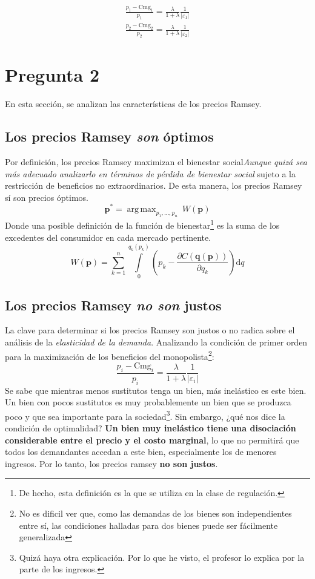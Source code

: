 \documentclass{article}
\DeclareMathOperator*{\argmax}{arg\,max}
\begin{document}
\begin{align}
    \frac{p_1 - \text{Cmg}_1}{p_1} = \frac{\lambda}{1+\lambda}\frac{1}{\vert \varepsilon_1 \vert} \tag{Opt 1}\\ 
    \frac{p_2 - \text{Cmg}_2}{p_2} = \frac{\lambda}{1+\lambda}\frac{1}{\vert \varepsilon_2 \vert} \tag{Opt 2}
\end{align}

\newpage

\section*{Pregunta 2}
En esta sección, se analizan las características de los precios Ramsey.
\subsection*{Los precios Ramsey \textit{son} óptimos}
Por definición, los precios Ramsey maximizan el bienestar social\textit{Aunque quizá sea más adecuado analizarlo en términos de pérdida de bienestar social} sujeto a la restricción de beneficios no extraordinarios. De esta manera, los precios Ramsey sí son precios óptimos.
\begin{equation*}
    \textbf{p}^* = \argmax_{p_1,\ldots,p_n} \ W(\textbf{p})
\end{equation*}
Donde una posible definición de la función de bienestar\footnote{De hecho, esta definición es la que se utiliza en la clase de regulación.} es la suma de los excedentes del consumidor en cada mercado pertinente.
\begin{equation*}
    W(\textbf{p}) = \sum_{k = 1}^n \int\limits_0^{q_k(p_k)}\left(p_k - \frac{\partial C(\textbf{q}(\textbf{p}))}{\partial q_k}\right)\text{d}q
\end{equation*}
\subsection*{Los precios Ramsey \textit{no son} justos}
La clave para determinar si los precios Ramsey son justos o no radica sobre el análisis de la \textit{elasticidad de la demanda}. Analizando la condición de primer orden para la maximización de los beneficios del monopolista\footnote{No es dificil ver que, como las demandas de los bienes son independientes entre sí, las condiciones halladas para dos bienes puede ser fácilmente generalizada}:
\begin{equation*}
    \frac{p_i - \text{Cmg}_i}{p_i} = \frac{\lambda}{1+\lambda}\frac{1}{\vert \varepsilon_i \vert} 
\end{equation*}
Se sabe que mientras menos sustitutos tenga un bien, más inelástico es este bien. Un bien con pocos sustitutos es muy probablemente un bien que se produzca poco y que sea importante para la sociedad\footnote{Quizá haya otra explicación. Por lo que he visto, el profesor lo explica por la parte de los ingresos.}. Sin embargo, ¿qué nos dice la condición de optimalidad? \textbf{Un bien muy inelástico tiene una disociación considerable entre el precio y el costo marginal}, lo que no permitirá que todos los demandantes accedan a este bien, especialmente los de menores ingresos. Por lo tanto, los precios ramsey \textbf{no son justos}.
\end{document}
